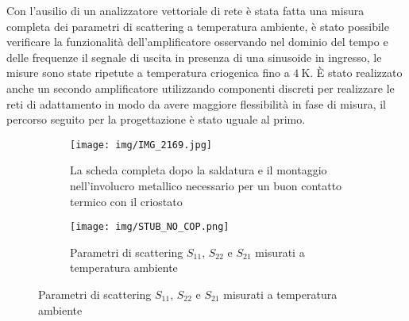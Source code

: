 \documentclass[12pt]{article}
\begin{document}
Con l'ausilio di un analizzatore vettoriale di rete è stata fatta una misura completa dei parametri di scattering a temperatura ambiente, è stato possibile verificare la funzionalità dell'amplificatore osservando nel dominio del tempo e delle frequenze il segnale di uscita in presenza di una sinusoide in ingresso, le misure sono state ripetute a temperatura criogenica fino a $\SI{4}{\kelvin}$.
È stato realizzato anche un secondo amplificatore utilizzando componenti discreti per realizzare le reti di adattamento in modo da avere maggiore flessibilità in fase di misura, il percorso seguito per la progettazione è stato uguale al primo.
\begin{figure}[H]
    \centering
    \begin{subfigure}[b]{0.45\textwidth}
        \centering
        \texttt{[image: img/IMG\_2169.jpg]}
        \caption{La scheda completa dopo la saldatura e il montaggio nell'involucro metallico necessario per un buon contatto termico con il criostato}
    \end{subfigure}
    \hfill
    \begin{subfigure}[b]{0.45\textwidth}
        \centering
        \texttt{[image: img/STUB\_NO\_COP.png]}
        \caption{Parametri di scattering $S_{11}$, $S_{22}$ e $S_{21}$ misurati a temperatura ambiente}
    \end{subfigure}
\end{figure}
\end{document}
